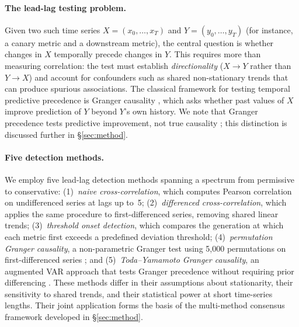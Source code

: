 \paragraph{The lead-lag testing problem.}
Given two such time series $X = (x_0, \ldots, x_T)$ and $Y = (y_0, \ldots, y_T)$ (for instance, a canary metric and a downstream metric), the central question is whether changes in $X$ temporally precede changes in $Y$.
This requires more than measuring correlation: the test must establish \emph{directionality} ($X \to Y$ rather than $Y \to X$) and account for confounders such as shared non-stationary trends that can produce spurious associations.
The classical framework for testing temporal predictive precedence is Granger causality \cite{granger1969investigating}, which asks whether past values of $X$ improve prediction of $Y$ beyond $Y$'s own history.
We note that Granger precedence tests predictive improvement, not true causality \cite{shojaie2022granger}; this distinction is discussed further in \S\ref{sec:method}.

\paragraph{Five detection methods.}
We employ five lead-lag detection methods spanning a spectrum from permissive to conservative:
(1)~\emph{naive cross-correlation}, which computes Pearson correlation on undifferenced series at lags up to~5;
(2)~\emph{differenced cross-correlation}, which applies the same procedure to first-differenced series, removing shared linear trends;
(3)~\emph{threshold onset detection}, which compares the generation at which each metric first exceeds a predefined deviation threshold;
(4)~\emph{permutation Granger causality}, a non-parametric Granger test using 5{,}000 permutations on first-differenced series \cite{shojaie2022granger}; and
(5)~\emph{Toda--Yamamoto Granger causality}, an augmented VAR approach that tests Granger precedence without requiring prior differencing \cite{toda1995statistical}.
These methods differ in their assumptions about stationarity, their sensitivity to shared trends, and their statistical power at short time-series lengths.
Their joint application forms the basis of the multi-method consensus framework developed in \S\ref{sec:method}.